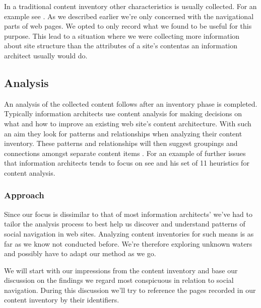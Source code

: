 In a traditional content inventory other characteristics
is usually collected. For an example see \citet[p.~269]{wodtke02}.
As we described earlier we're only concerned with the navigational parts of
web pages. We opted to only record what we found to be useful for this
purpose. This lead to a situation where we were collecting more information
about site structure than the attributes of a site's content\dash{}as an
information architect usually would do.

\subsection{Analysis}

An analysis of the collected content follows after an inventory phase is
completed. Typically information architects use content analysis for
making decisions on what and how to improve an existing web site's content
architecture. With such an aim they look for patterns and relationships when
analyzing their content inventory. These patterns and relationships will then
suggest groupings and connections amongst separate content items
\cite[p.~243]{morville06}. For an example of further issues that information
architects tends to focus on see \citet{leise07} and his set of 11 heuristics%
for content analysis.

\subsubsection{Approach}
Since our focus is dissimilar to that of most information architects' we've
had to tailor the analysis process to best help us discover and understand
patterns of social navigation in web sites. Analyzing content inventories for
such means is as far as we know not conducted before. We're therefore
exploring unknown waters and possibly have to adapt our method as we go.

We will start with our impressions from the content inventory%
and base our discussion on the findings we regard most conspicuous in
relation to social navigation. During this discussion we'll try to reference
the pages recorded in our content inventory by their identifiers.
